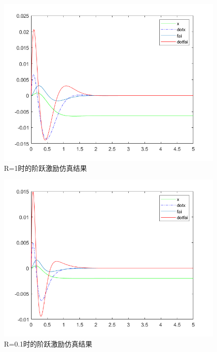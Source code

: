 \begin{figure}[hbpt]
\centering
\includegraphics[width=12cm]{1000_100_2.png}
\caption{R=1时的阶跃激励仿真结果}\label{1000_100_2}
\end{figure}
\begin{figure}[hbpt]
\centering
\includegraphics[width=12cm]{1000_100_3.png}
\caption{R=0.1时的阶跃激励仿真结果}\label{1000_100_3}
\end{figure}
